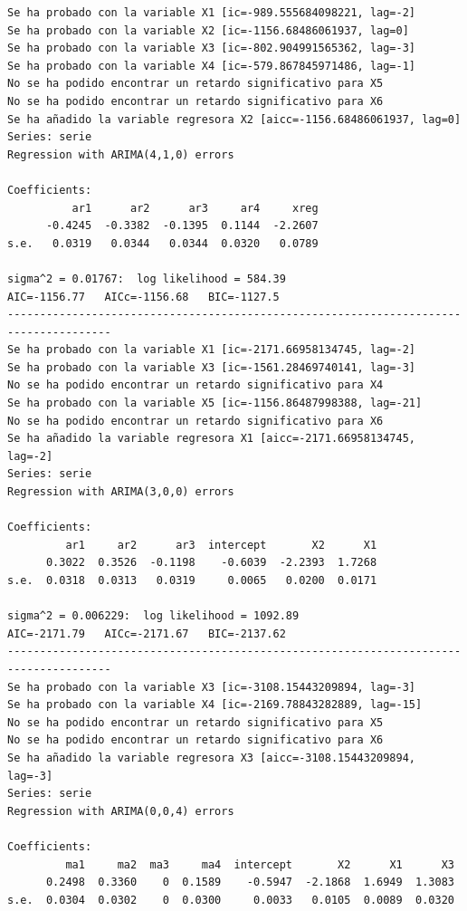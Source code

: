 \documentclass[
  12pt,
  a4paper]{article}
\begin{document}
\begin{verbatim}
Se ha probado con la variable X1 [ic=-989.555684098221, lag=-2]
Se ha probado con la variable X2 [ic=-1156.68486061937, lag=0]
Se ha probado con la variable X3 [ic=-802.904991565362, lag=-3]
Se ha probado con la variable X4 [ic=-579.867845971486, lag=-1]
No se ha podido encontrar un retardo significativo para X5
No se ha podido encontrar un retardo significativo para X6
Se ha añadido la variable regresora X2 [aicc=-1156.68486061937, lag=0]
Series: serie 
Regression with ARIMA(4,1,0) errors 

Coefficients:
          ar1      ar2      ar3     ar4     xreg
      -0.4245  -0.3382  -0.1395  0.1144  -2.2607
s.e.   0.0319   0.0344   0.0344  0.0320   0.0789

sigma^2 = 0.01767:  log likelihood = 584.39
AIC=-1156.77   AICc=-1156.68   BIC=-1127.5
--------------------------------------------------------------------------------------
Se ha probado con la variable X1 [ic=-2171.66958134745, lag=-2]
Se ha probado con la variable X3 [ic=-1561.28469740141, lag=-3]
No se ha podido encontrar un retardo significativo para X4
Se ha probado con la variable X5 [ic=-1156.86487998388, lag=-21]
No se ha podido encontrar un retardo significativo para X6
Se ha añadido la variable regresora X1 [aicc=-2171.66958134745, lag=-2]
Series: serie 
Regression with ARIMA(3,0,0) errors 

Coefficients:
         ar1     ar2      ar3  intercept       X2      X1
      0.3022  0.3526  -0.1198    -0.6039  -2.2393  1.7268
s.e.  0.0318  0.0313   0.0319     0.0065   0.0200  0.0171

sigma^2 = 0.006229:  log likelihood = 1092.89
AIC=-2171.79   AICc=-2171.67   BIC=-2137.62
--------------------------------------------------------------------------------------
Se ha probado con la variable X3 [ic=-3108.15443209894, lag=-3]
Se ha probado con la variable X4 [ic=-2169.78843282889, lag=-15]
No se ha podido encontrar un retardo significativo para X5
No se ha podido encontrar un retardo significativo para X6
Se ha añadido la variable regresora X3 [aicc=-3108.15443209894, lag=-3]
Series: serie 
Regression with ARIMA(0,0,4) errors 

Coefficients:
         ma1     ma2  ma3     ma4  intercept       X2      X1      X3
      0.2498  0.3360    0  0.1589    -0.5947  -2.1868  1.6949  1.3083
s.e.  0.0304  0.0302    0  0.0300     0.0033   0.0105  0.0089  0.0320


\end{verbatim}
\end{document}
